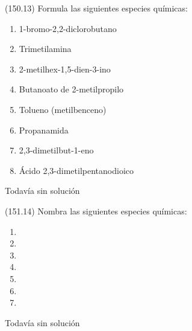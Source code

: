   \begin{exercise}[
      tags    = {},
      topics  = {química, química orgánica, orgánica},
      source  = {FQ 1B MGH 2016, p150, e13},
    ]
    (150.13) Formula las siguientes especies químicas:
    \begin{enumerate}
      \item 1-bromo-2,2-diclorobutano
      \item Trimetilamina
      \item 2-metilhex-1,5-dien-3-ino
      \item Butanoato de 2-metilpropilo
      \item Tolueno (metilbenceno)
      \item Propanamida
      \item 2,3-dimetilbut-1-eno
      \item Ácido 2,3-dimetilpentanodioico
    \end{enumerate}
  \end{exercise}

  \begin{solution}[print=false]
    Todavía sin solución
  \end{solution}




  \begin{exercise}[
      tags    = {},
      topics  = {química, química orgánica, orgánica},
      source  = {FQ 1B MGH 2016, p151, e14},
    ]
    (151.14) Nombra las siguientes especies químicas:
    \begin{enumerate}
      \item {}
      \item {}
      \item {}
      \item {}
      \item {}
      \item {}
      \item {}
    \end{enumerate}
  \end{exercise}

  \begin{solution}[print=false]
    Todavía sin solución
  \end{solution}




